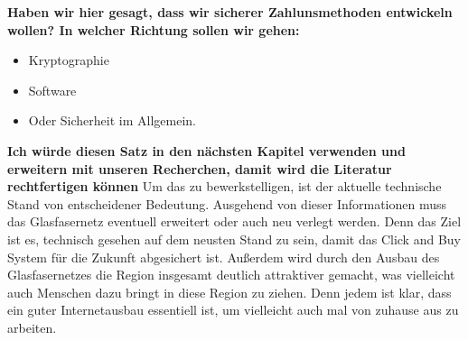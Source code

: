 \textbf{Haben wir hier gesagt, dass wir sicherer Zahlunsmethoden entwickeln wollen? In welcher Richtung
sollen wir gehen:}

\begin{itemize}
    \item Kryptographie
    \item Software
    \item Oder Sicherheit im Allgemein.
\end{itemize}






\textbf{Ich würde diesen Satz in den nächsten Kapitel verwenden und erweitern mit unseren Recherchen, damit wird 
die Literatur rechtfertigen können}
Um das zu bewerkstelligen, ist der aktuelle technische Stand von entscheidener Bedeutung. 
Ausgehend von dieser Informationen muss das Glasfasernetz eventuell erweitert oder auch neu verlegt werden.
Denn das Ziel ist es, technisch gesehen auf dem neusten Stand zu sein, damit das Click and Buy System für die Zukunft abgesichert ist.
Außerdem wird durch den Ausbau des Glasfasernetzes die Region insgesamt deutlich attraktiver gemacht, was vielleicht auch Menschen dazu bringt
in diese Region zu ziehen. Denn jedem ist klar, dass ein guter Internetausbau essentiell ist, um vielleicht auch mal von zuhause aus zu arbeiten.